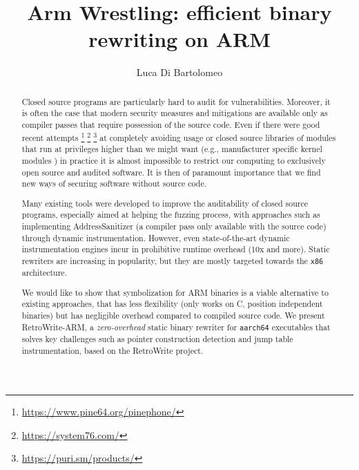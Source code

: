 \documentclass[a4paper,11pt,oneside]{report}
\title{Arm Wrestling: efficient binary rewriting on ARM}
\author{Luca Di Bartolomeo} \adviser{Prof. Mathias Payer (EPFL)}
\newcommand{\sysname}{RetroWrite\xspace}
\begin{document}
\maketitle
\makededication
\makeacks


\begin{abstract}


	Closed source programs are particularly hard to audit for vulnerabilities.
	Moreover, it is often the case that modern security measures and
	mitigations are available only as compiler passes that require possession
	of the source code. Even if there were good recent attempts
	\footnote{\url{https://www.pine64.org/pinephone/}}
	\footnote{\url{https://system76.com/}}
	\footnote{\url{https://puri.sm/products/}}
	at completely avoiding usage or closed source libraries of modules that run
	at privileges higher than we might want (e.g., manufacturer specific kernel
	modules \cite{androidclosed})
	in practice it is almost impossible to restrict our computing to
	exclusively open source and audited software.  It is then of paramount
	importance that we find new ways of securing software without source code.



	Many existing tools were developed to improve the auditability of closed
	source programs, especially aimed at helping the fuzzing process, with
	approaches such as implementing AddressSanitizer (a compiler pass only
	available with the source code) through dynamic instrumentation. However,  
	even state-of-the-art dynamic instrumentation engines incur in prohibitive 
	runtime overhead (10x and more). Static rewriters are increasing in popularity, 
	but they are mostly targeted towards the \texttt{x86} architecture.

	We would like to show that symbolization for ARM binaries 
	is a viable alternative to existing approaches, that has less flexibility 
	(only works on C, position independent binaries) but has
	negligible overhead compared to compiled source code. We present 
	RetroWrite-ARM, a \emph{zero-overhead} static binary rewriter for \texttt{aarch64}
	executables that solves key challenges such as pointer construction
	detection and jump table instrumentation, based on 
	the \sysname project.


\end{abstract}
\end{document}
